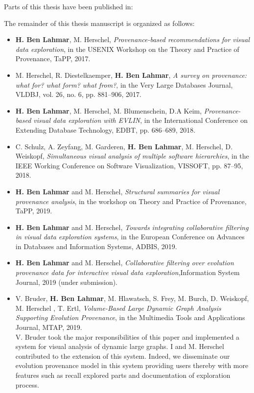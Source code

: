 Parts of this thesis have been published in:

The remainder of this thesis manuscript is organized as follows:
{\color{Fuchsia}
\begin{itemize}
\item \textbf{H. Ben Lahmar}, M. Herschel, \emph{Provenance-based recommendations for visual data exploration}, in the USENIX Workshop on the Theory and Practice of Provenance, TaPP, 2017.
\item M. Herschel, R. Diestelkaemper, \textbf{H. Ben Lahmar}, \emph{A survey on provenance: what for? what form? what from?}, in the Very Large Databases Journal, VLDBJ, vol. 26, no. 6, pp. 881--906, 2017. 
\item \textbf{H. Ben Lahmar}, M. Herschel, M. Blumenschein, D.A  Keim, \emph{Provenance-based visual data exploration with EVLIN}, in the International Conference on Extending Database Technology, EDBT, pp. 686--689, 2018. 
\item C. Schulz, A. Zeyfang, M. Garderen, \textbf{H. Ben Lahmar}, M. Herschel, D. Weiskopf, \emph{Simultaneous visual analysis of multiple software hierarchies}, in the IEEE Working Conference on Software Visualization, VISSOFT, pp. 87--95, 2018. 
\item \textbf{H. Ben Lahmar} and M. Herschel, \emph{Structural summaries for visual provenance analysis}, in the workshop on Theory and Practice of Provenance, TaPP, 2019.
\item \textbf{H. Ben Lahmar} and M. Herschel, \emph{Towards integrating collaborative filtering in visual data exploration systems}, in the European Conference on Advances in Databases and Information Systems, ADBIS, 2019.

\item \textbf{H. Ben Lahmar} and M. Herschel, \emph{Collaborative filtering over evolution provenance data for interactive visual data exploration},Information System Journal, 2019 (under submission).
\item  V. Bruder, \textbf{H. Ben Lahmar}, M. Hlawatsch, S. Frey, M. Burch, D. Weiskopf, M. Herschel , T. Ertl, \emph{Volume-Based Large Dynamic Graph Analysis Supporting Evolution Provenance}, in the Multimedia Tools and Applications Journal, MTAP, 2019.\\
V. Bruder  took the major responsibilities of this paper and implemented a system for visual analysis of dynamic large graphs. I and M. Herschel contributed to the extension of this system. Indeed, we disseminate our evolution provenance model in this system providing users thereby with more features such as recall explored parts and documentation of exploration process.


\end{itemize}}